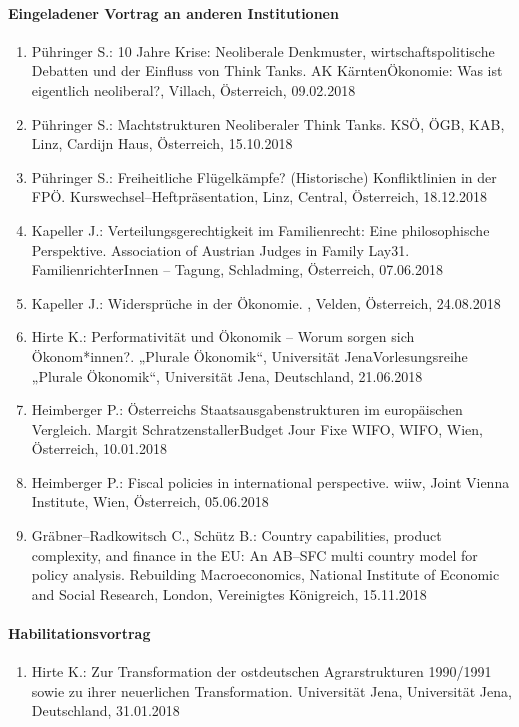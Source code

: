 \paragraph{Eingeladener Vortrag an anderen Institutionen}
\begin{enumerate}
	\item Pühringer S.: 10 Jahre Krise: Neoliberale Denkmuster, wirtschaftspolitische Debatten und der Einfluss von Think Tanks. AK KärntenÖkonomie: Was ist eigentlich neoliberal?, Villach, Österreich, 09.02.2018
	\item Pühringer S.: Machtstrukturen Neoliberaler Think Tanks. KSÖ, ÖGB, KAB, Linz, Cardijn Haus, Österreich, 15.10.2018
	\item Pühringer S.: Freiheitliche Flügelkämpfe? (Historische) Konfliktlinien in der FPÖ. Kurswechsel--Heftpräsentation, Linz, Central, Österreich, 18.12.2018
	\item Kapeller J.: Verteilungsgerechtigkeit im Familienrecht: Eine philosophische Perspektive. Association of Austrian Judges in Family Lay31. FamilienrichterInnen -- Tagung, Schladming, Österreich, 07.06.2018
	\item Kapeller J.: Widersprüche in der Ökonomie. , Velden, Österreich, 24.08.2018
	\item Hirte K.: Performativität und Ökonomik – Worum sorgen sich Ökonom*innen?. „Plurale Ökonomik“, Universität JenaVorlesungsreihe „Plurale Ökonomik“, Universität Jena, Deutschland, 21.06.2018
	\item Heimberger P.: Österreichs Staatsausgabenstrukturen im europäischen Vergleich. Margit SchratzenstallerBudget Jour Fixe WIFO, WIFO, Wien, Österreich, 10.01.2018
	\item Heimberger P.: Fiscal policies in international perspective. wiiw, Joint Vienna Institute, Wien, Österreich, 05.06.2018
	\item Gräbner--Radkowitsch C., Schütz B.: Country capabilities, product complexity, and finance in the EU:  An AB--SFC multi country model for policy analysis. Rebuilding Macroeconomics, National Institute of Economic and Social Research, London, Vereinigtes Königreich, 15.11.2018
\end{enumerate}
\paragraph{Habilitationsvortrag}
\begin{enumerate}
	\item Hirte K.: Zur Transformation der ostdeutschen Agrarstrukturen 1990/1991 sowie zu ihrer neuerlichen Transformation. Universität Jena, Universität Jena, Deutschland, 31.01.2018
\end{enumerate}
